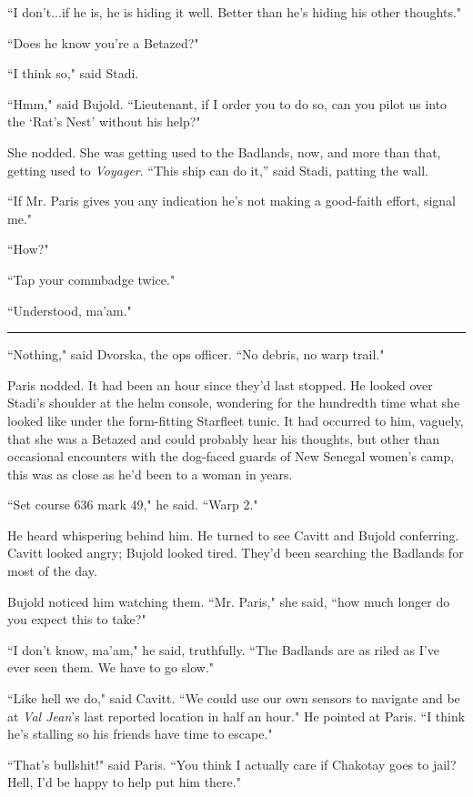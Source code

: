 \documentclass[twoside,letterpaper,12pt]{memoir}
\begin{document}
``I don't...if he is, he is hiding it well. Better than he's hiding his other thoughts."

``Does he know you're a Betazed?"

``I think so," said Stadi.

``Hmm," said Bujold. ``Lieutenant, if I order you to do so, can you pilot us into the ‘Rat’s Nest’ without his help?"

She nodded. She was getting used to the Badlands, now, and more than that, getting used to \textit{Voyager}. ``This ship can do it,'' said Stadi, patting the wall.

``If Mr. Paris gives you any indication he's not making a good-faith effort, signal me."

``How?"

``Tap your commbadge twice."

``Understood, ma'am."

\begin{center}\rule{3cm}{0.4 pt}\end{center}

``Nothing," said Dvorska, the ops officer. ``No debris, no warp trail."

Paris nodded. It had been an hour since they'd last stopped. He looked over Stadi's shoulder at the helm console, wondering for the hundredth time what she looked like under the form-fitting Starfleet tunic. It had occurred to him, vaguely, that she was a Betazed and could probably hear his thoughts, but other than occasional encounters with the dog-faced guards of New Senegal women's camp, this was as close as he'd been to a woman in years.

``Set course 636 mark 49," he said. ``Warp 2."

He heard whispering behind him. He turned to see Cavitt and Bujold conferring. Cavitt looked angry; Bujold looked tired. They'd been searching the Badlands for most of the day.

Bujold noticed him watching them. ``Mr. Paris," she said, ``how much longer do you expect this to take?"

``I don't know, ma'am," he said, truthfully. ``The Badlands are as riled as I've ever seen them. We have to go slow."

``Like hell we do," said Cavitt. ``We could use our own sensors to navigate and be at \textit{Val Jean}'s last reported location in half an hour." He pointed at Paris. ``I think he’s stalling so his friends have time to escape."

``That's bullshit!" said Paris. ``You think I actually care if Chakotay goes to jail? Hell, I'd be happy to help put him there."
\end{document}
